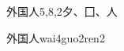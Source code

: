 \begin{entry}{外国人}{5,8,2}{⼣、⼞、⼈}
  \begin{phonetics}{外国人}{wai4guo2ren2}
  \end{phonetics}
\end{entry}
